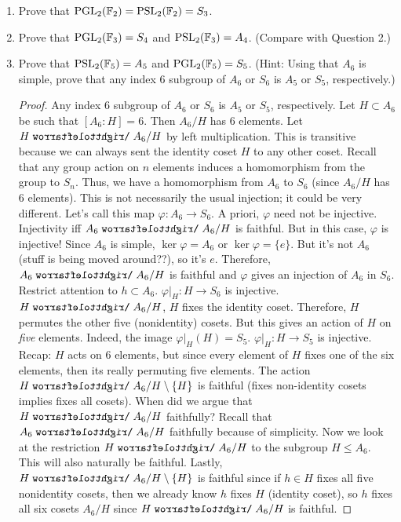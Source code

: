 \documentclass[../psets.tex]{subfiles}
\begin{document}
\begin{enumerate}
\begin{enumerate}
\begin{proof}
            \begin{equation*}
                |\text{PGL}_2(\F_p)| = \frac{|G|}{|\lambda I|}
                = \frac{(p^2-1)p(p-1)}{p-1}
                = (p^2-1)p
            \end{equation*}
        \end{proof}
        \item Prove that $\text{PGL}_2(\mathbb{F}_2)=\text{PSL}_2(\mathbb{F}_2)=S_3$.
        \item Prove that $\text{PGL}_2(\mathbb{F}_3)=S_4$ and $\text{PSL}_2(\mathbb{F}_3)=A_4$. (Compare with Question 2.)
        \item Prove that $\text{PSL}_2(\mathbb{F}_5)=A_5$ and $\text{PGL}_2(\mathbb{F}_5)=S_5$. (Hint: Using that $A_6$ is simple, prove that any index 6 subgroup of $A_6$ or $S_6$ is $A_5$ or $S_5$, respectively.)
        \begin{proof}
            Any index 6 subgroup of $A_6$ or $S_6$ is $A_5$ or $S_5$, respectively.
            Let $H\subset A_6$ be such that $[A_6:H]=6$. Then $A_6/H$ has 6 elements. Let $H\acts A_6/H$ by left multiplication. This is transitive because we can always sent the identity coset $H$ to any other coset. Recall that any group action on $n$ elements induces a homomorphism from the group to $S_n$. Thus, we have a homomorphism from $A_6$ to $S_6$ (since $A_6/H$ has 6 elements). This is not necessarily the usual injection; it could be very different. Let's call this map $\varphi:A_6\to S_6$. A priori, $\varphi$ need not be injective. Injectivity iff $A_6\acts A_6/H$ is faithful. But in this case, $\varphi$ is injective! Since $A_6$ is simple, $\ker\varphi=A_6$ or $\ker\varphi=\{e\}$. But it's not $A_6$ (stuff is being moved around??), so it's $e$. Therefore, $A_6\acts A_6/H$ is faithful and $\varphi$ gives an injection of $A_6$ in $S_6$. Restrict attention to $h\subset A_6$. $\varphi|_H:H\to S_6$ is injective. $H\acts A_6/H$, $H$ fixes the identity coset. Therefore, $H$ permutes the other five (nonidentity) cosets. But this gives an action of $H$ on \emph{five} elements. Indeed, the image $\varphi|_H(H)=S_5$. $\varphi|_H:H\to S_5$ is injective. Recap: $H$ acts on 6 elements, but since every element of $H$ fixes one of the six elements, then its really permuting five elements. The action $H\acts A_6/H\setminus\{H\}$ is faithful (fixes non-identity cosets implies fixes all cosets).
            When did we argue that $H\acts A_6/H$ faithfully? Recall that $A_6\acts A_6/H$ faithfully because of simplicity. Now we look at the restriction $H\acts A_6/H$ to the subgroup $H\leq A_6$. This will also naturally be faithful. Lastly, $H\acts A_6/H\setminus\{H\}$ is faithful since if $h\in H$ fixes all five nonidentity cosets, then we already know $h$ fixes $H$ (identity coset), so $h$ fixes all six cosets $A_6/H$ since $H\acts A_6/H$ is faithful.

\end{proof}
\end{enumerate}
\end{enumerate}
\end{document}
